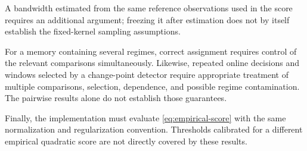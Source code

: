 \documentclass[11pt]{article}
\begin{document}
A bandwidth estimated from the same reference observations
used in the score requires an additional argument;
freezing it after estimation does not by itself establish
the fixed-kernel sampling assumptions.

For a memory containing several regimes, correct
assignment requires control of the relevant comparisons
simultaneously. Likewise, repeated online decisions and
windows selected by a change-point detector require
appropriate treatment of multiple comparisons, selection,
dependence, and possible regime contamination. The
pairwise results alone do not establish those guarantees.

Finally, the implementation must evaluate
\eqref{eq:empirical-score} with the same normalization
and regularization convention. Thresholds calibrated for
a different empirical quadratic score are not directly
covered by these results.
\end{document}
